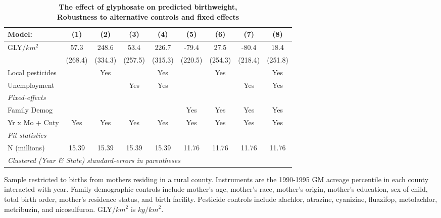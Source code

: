 \begin{table}[htbp]
   \centering
   \small
   \begin{threeparttable}[b]
      \caption{\label{tab:robust-cntrl-dbwt_pred-percentilegmacres} \textbf{The effect of glyphosate on predicted birthweight, \\ Robustness to alternative controls and fixed effects}}
      \begin{tabular}{lcccccccc}
         \toprule
         Model:           & (1)     & (2)     & (3)     & (4)     & (5)     & (6)     & (7)     & (8)\\  
         \midrule 
         GLY/$km^2$       & 57.3    & 248.6   & 53.4    & 226.7   & -79.4   & 27.5    & -80.4   & 18.4\\   
                          & (268.4) & (334.3) & (257.5) & (315.3) & (220.5) & (254.3) & (218.4) & (251.8)\\   
         Local pesticides &         & Yes     &         & Yes     &         & Yes     &         & Yes\\  
         Unemployment     &         &         & Yes     & Yes     &         &         & Yes     & Yes\\  
         \midrule
         \emph{Fixed-effects}\\
         Family Demog     &         &         &         &         & Yes     & Yes     & Yes     & Yes\\  
         Yr x Mo + Cnty   & Yes     & Yes     & Yes     & Yes     & Yes     & Yes     & Yes     & Yes\\  
         \midrule
         \emph{Fit statistics}\\
         N (millions)     & 15.39   & 15.39   & 15.39   & 15.39   & 11.76   & 11.76   & 11.76   & 11.76\\  
         \midrule
         \multicolumn{9}{l}{\emph{Clustered (Year \& State) standard-errors in parentheses}}\\
      \end{tabular}
      
      \begin{tablenotes}\item Sample restricted to births from mothers residing in a rural county. Instruments are the 1990-1995 GM acreage percentile in each county interacted with year. Family demographic controls include mother's age, mother's race, mother's origin, mother's education, sex of child, total birth order, mother's residence status, and birth facility. Pesticide controls include alachlor, atrazine, cyanizine, fluazifop, metolachlor, metribuzin, and nicosulfuron. GLY/$km^2$ is $kg/km^2$.
      \end{tablenotes}
   \end{threeparttable}
\end{table}
